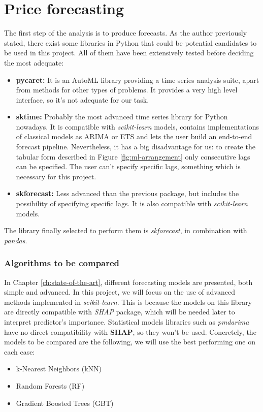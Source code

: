 \section{Price forecasting}
The first step of the analysis is to produce forecasts. As the author previously stated, there exist some libraries in Python that could be potential candidates to be used in this project. All of them have been extensively tested before deciding the most adequate:
\begin{itemize}
    \item \textbf{pycaret\cite{PyCaret}:} It is an AutoML library providing a time series analysis suite, apart from methods for other types of problems. It provides a very high level interface, so it's not adequate for our task.
    \item \textbf{sktime:} Probably the most advanced time series library for Python nowadays. It is compatible with \textit{scikit-learn}\cite{scikit-learn} models, contains implementations of classical models as ARIMA or ETS and lets the user build an end-to-end forecast pipeline. Nevertheless, it has a big disadvantage for us: to create the tabular form described in Figure \ref{fig:ml-arrangement} only consecutive lags can be specified. The user can't specify specific lags, something which is necessary for this project.
    \item \textbf{skforecast\cite{skforecast}:} Less advanced than the previous package, but includes the possibility of specifying specific lags. It is also compatible with \textit{scikit-learn} models.
\end{itemize}

\noindent The library finally selected to perform them is \textit{skforecast}, in combination with \textit{pandas}.

\subsubsection{Algorithms to be compared}
In Chapter \ref{ch:state-of-the-art}, different forecasting models are presented, both simple and advanced. In this project, we will focus on the use of advanced methods implemented in \textit{scikit-learn}. This is because the models on this library are directly compatible with \textit{SHAP}\cite{shap-package} package, which will be needed later to interpret predictor's importance. Statistical models libraries such as \textit{pmdarima}\cite{pmdarima} have no direct compatibility with \textbf{SHAP}, so they won't be used. Concretely, the models to be compared are the following, we will use the best performing one on each case:
\begin{itemize}
    \item k-Nearest Neighbors (kNN)
    \item Random Forests (RF)
    \item Gradient Boosted Trees (GBT)
\end{itemize}


